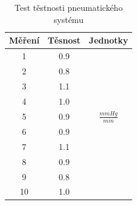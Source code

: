 \begin{table}
    \label{tab:pressure_test_pneu}
    \caption{Test těstnosti pneumatického systému}
    \begin{tabular}{ccc}
        \toprule
        Měření & Těsnost & Jednotky           \\ \midrule
        1      & 0.9     &                    \\
        2      & 0.8     &                    \\
        3      & 1.1     &                    \\
        4      & 1.0     &                    \\
        5      & 0.9     & $\frac{mmHg}{min}$ \\
        6      & 0.9     &                    \\
        7      & 1.1     &                    \\
        8      & 0.9     &                    \\
        9      & 0.8     &                    \\
        10     & 1.0     &                    \\
        \bottomrule
    \end{tabular}
\end{table}

